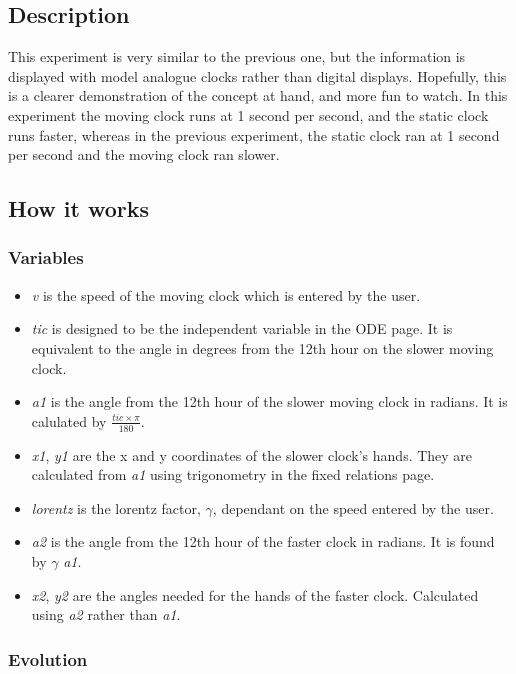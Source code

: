 \subsection*{Description}
\label{sec-2-1}

This experiment is very similar to the previous one, but the information is displayed with model analogue clocks rather than digital displays. Hopefully, this is a clearer demonstration of the concept at hand, and more fun to watch.
In this experiment the moving clock runs at 1 second per second, and the static clock runs faster, whereas in the previous experiment, the static clock ran at 1 second per second and the moving clock ran slower.
\subsection*{How it works}
\label{sec-2-2}
\subsubsection*{Variables}
\label{sec-2-2-1}

\begin{itemize}
\item \emph{v} is the speed of the moving clock which is entered by the user.
\item \emph{tic} is designed to be the independent variable in the ODE page. It is equivalent to the angle in degrees from the 12th hour on the slower moving clock.
\item \emph{a1} is the angle from the 12th hour of the slower moving clock in radians. It is calulated by $\frac{tic \times \pi}{180}$.
\item \emph{x1}, \emph{y1} are the x and y coordinates of the slower clock's hands. They are calculated from \emph{a1} using trigonometry in the fixed relations page.
\item \emph{lorentz} is the lorentz factor, $\gamma$, dependant on the speed entered by the user.
\item \emph{a2} is the angle from the 12th hour of the faster clock in radians. It is found by $\gamma$ \texttimes{} \emph{a1}.
\item \emph{x2}, \emph{y2} are the angles needed for the hands of the faster clock. Calculated using \emph{a2} rather than \emph{a1}.
\end{itemize}
\subsubsection*{Evolution}
\label{sec-2-2-2}

